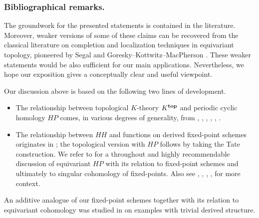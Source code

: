\subsubsection{Bibliographical remarks.}
The groundwork for the presented statements is contained in the literature. Moreover, weaker versions of some of these claims can be recovered from the classical literature on completion and localization techniques in equivariant topology, pioneered by Segal \cite{Seg68} and Goresky--Kottwitz--MacPherson \cite{GKM97}. These weaker statements would be also sufficient for our main applications. Nevertheless, we hope our exposition gives a conceptually clear and useful viewpoint. 

Our discussion above is based on the following two lines of development.
\begin{itemize}
    \item The relationship between topological $K$-theory $K^{\mathbf{top}}$ and periodic cyclic homology $HP$ comes, in various degrees of generality, from \cite{Bla16}, \cite{HLP20}, \cite{Kon21}, \cite{ES21}, \cite{Kha23}, \cite{LS25}. 
    \item The relationship between $HH$ and functions on derived fixed-point schemes originates in \cite{BFN10}; the topological version with $HP$ follows by taking the Tate construction. We refer to \cite{Chen20} for a throughout and highly recommendable discussion of equivariant $HP$ with its relation to fixed-point schemes and ultimately to singular cohomology of fixed-points. Also see \cite{Bha12}, \cite{ACH19}, \cite{HSS17}, \cite{BN12, BN13}, \cite{Toe14} for more context.
\end{itemize}
An additive analogue of our fixed-point schemes together with its relation to equivariant cohomology was studied in \cite{HR23} on examples with trivial derived structure.